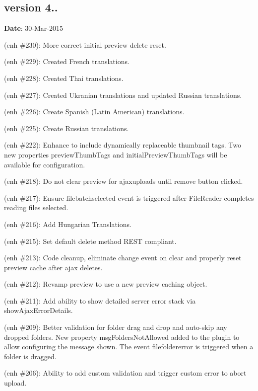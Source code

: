 \subsection*{version 4..}

{\bfseries Date}\+: 30-\/\+Mar-\/2015


\begin{DoxyItemize}
\item (enh \#230)\+: More correct initial preview delete reset.
\item (enh \#229)\+: Created French translations.
\item (enh \#228)\+: Created Thai translations.
\item (enh \#227)\+: Created Ukranian translations and updated Russian translations.
\item (enh \#226)\+: Create Spanish (Latin American) translations.
\item (enh \#225)\+: Create Russian translations.
\item (enh \#222)\+: Enhance to include dynamically replaceable thumbnail tags. Two new properties {\ttfamily preview\+Thumb\+Tags} and {\ttfamily initial\+Preview\+Thumb\+Tags} will be available for configuration.
\item (enh \#218)\+: Do not clear preview for ajaxuploads until remove button clicked.
\item (enh \#217)\+: Ensure {\ttfamily filebatchselected} event is triggered after File\+Reader completes reading files selected.
\item (enh \#216)\+: Add Hungarian Translations.
\item (enh \#215)\+: Set default delete method R\+E\+ST compliant.
\item (enh \#213)\+: Code cleanup, eliminate change event on clear and properly reset preview cache after ajax deletes.
\item (enh \#212)\+: Revamp preview to use a new preview caching object.
\item (enh \#211)\+: Add ability to show detailed server error stack via {\ttfamily show\+Ajax\+Error\+Details}.
\item (enh \#209)\+: Better validation for folder drag and drop and auto-\/skip any dropped folders. New property {\ttfamily msg\+Folders\+Not\+Allowed} added to the plugin to allow configuring the message shown. The event {\ttfamily filefoldererror} is triggered when a folder is dragged.
\item (enh \#206)\+: Ability to add custom validation and trigger custom error to abort upload.

\end{DoxyItemize}
